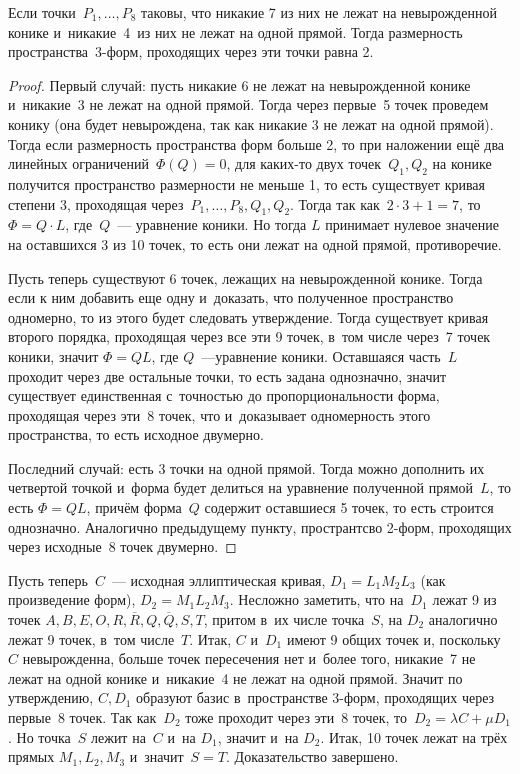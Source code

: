 \documentclass{article}
\begin{document}
\begin{claim}
  Если точки~$P_1, \ldots, P_8$ таковы, что никакие 7 из них не лежат на
  невырожденной конике и~никакие~4~из них не лежат на одной прямой. Тогда
  размерность пространства~3-форм, проходящих через эти точки равна 2.
\end{claim}
\begin{proof}
  Первый случай: пусть никакие 6 не лежат на невырожденной конике и~никакие~3 не
  лежат на одной прямой. Тогда через первые~5 точек проведем конику (она будет
  невырождена, так как никакие 3 не лежат на одной прямой). Тогда если
  размерность пространства форм больше 2, то при наложении ещё два линейных
  ограничений~$\Phi(Q) = 0$, для каких-то двух точек~$Q_1, Q_2$ на конике
  получится пространство размерности не меньше 1, то есть существует кривая
  степени 3, проходящая через~$P_1, \ldots, P_8, Q_1, Q_2$. Тогда так как~$2
  \cdot 3 + 1 = 7$, то $\Phi = Q \cdot L$, где~$Q$~--- уравнение коники. Но
  тогда $L$ принимает нулевое значение на оставшихся 3 из 10 точек, то есть они
  лежат на одной прямой, противоречие.

  Пусть теперь существуют 6 точек, лежащих на невырожденной конике. Тогда если к
  ним добавить еще одну и~доказать, что полученное пространство одномерно, то из
  этого будет следовать утверждение. Тогда существует кривая второго порядка,
  проходящая через все эти 9 точек, в~том числе через~7 точек коники, значит
  $\Phi = QL$, где $Q$~---уравнение коники. Оставшаяся часть~$L$ проходит через
  две остальные точки, то есть задана однозначно, значит существует
  единственная с~точностью до пропорциональности форма, проходящая через эти~8
  точек, что и~доказывает одномерность этого пространства, то есть исходное
  двумерно.

  Последний случай: есть 3 точки на одной прямой. Тогда можно дополнить их
  четвертой точкой и~форма будет делиться на уравнение полученной прямой~$L$, то
  есть $\Phi = QL$, причём форма~$Q$ содержит оставшиеся 5 точек, то есть
  строится однозначно. Аналогично предыдущему пункту, пространтсво 2-форм,
  проходящих через исходные~8 точек двумерно.
\end{proof}

Пусть теперь~$C$~--- исходная эллиптическая кривая, $D_1 = L_1 M_2 L_3$ (как
произведение форм), $D_2 = M_1 L_2 M_3$. Несложно заметить, что на~$D_1$ лежат 9
из точек $A, B, E, O, R, \overline{R}, Q, \overline{Q}, S, T$, притом в~их числе
точка~$S$, на $D_2$ аналогично лежат 9 точек, в~том числе~$T$. Итак, $C$ и~$D_1$
имеют 9 общих точек и, поскольку~$C$ невырожденна, больше точек пересечения нет
и~более того, никакие~7 не лежат на одной конике и~никакие~4 не лежат на одной
прямой. Значит по утверждению, $C, D_1$ образуют базис в~пространстве 3-форм,
проходящих через первые~8 точек. Так как~$D_2$ тоже проходит через эти~8 точек,
то~$D_2 = \lambda C + \mu D_1$. Но точка~$S$ лежит на~$C$ и~на $D_1$, значит
и~на $D_2$. Итак, 10 точек лежат на трёх прямых $M_1, L_2, M_3$ и~значит~$S=T$.
Доказательство завершено.
\end{document}
